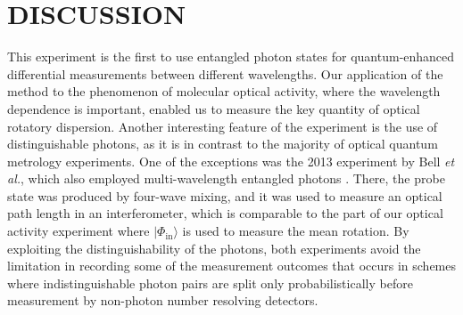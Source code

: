 \documentclass[12pt,preprint]{revtex4}
\begin{document}
\section*{DISCUSSION}
This experiment is the first to use entangled photon states for quantum-enhanced  differential measurements between different wavelengths. Our application of the method to the phenomenon of molecular optical activity, where the wavelength dependence is important, enabled us to measure the key quantity of optical rotatory dispersion.
Another interesting feature of the experiment is the use of distinguishable photons, as it is in contrast to the majority of optical quantum metrology experiments. One of the exceptions was the 2013 experiment by Bell \emph{et al.}, which also employed multi-wavelength entangled photons \citep{Bell2013}. There, the probe state was produced by four-wave mixing, and it was used to measure an optical path length in an interferometer, which is comparable to the part of our optical activity experiment where $|\Phi_{\mathrm{in}}\rangle$ is used to measure the mean rotation. By exploiting the distinguishability of the photons, both experiments avoid the limitation in recording some of the measurement outcomes that occurs in schemes where indistinguishable photon pairs are split only probabilistically before measurement by non-photon number resolving detectors. 
 
\end{document}
